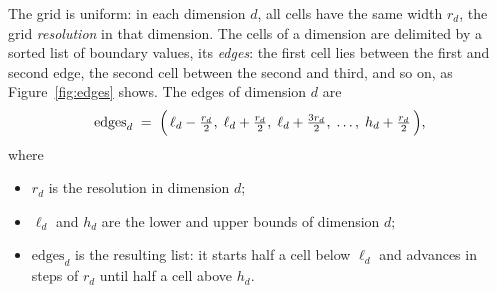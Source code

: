 \documentclass[11pt,a4paper]{article}
\theoremstyle{plain}
\theoremstyle{remark}
\begin{document}
	The grid is uniform: in each dimension $d$, all cells have the same
	width $r_d$, the grid \emph{resolution} in that dimension. The cells
	of a dimension are delimited by a sorted list of boundary values, its
	\emph{edges}: the first cell lies between the first and second edge,
	the second cell between the second and third, and so on, as
	Figure~\ref{fig:edges} shows. The edges of dimension $d$ are
	\begin{equation}
		\text{edges}_d \;=\; \Bigl(\, \ell_d - \tfrac{r_d}{2},\;
		\ell_d + \tfrac{r_d}{2},\; \ell_d + \tfrac{3 r_d}{2},\; \dots,\;
		h_d + \tfrac{r_d}{2} \,\Bigr),
		\label{eq:bins}
	\end{equation}
	where
	\begin{itemize}
		\item $r_d$ is the resolution in dimension $d$;
		\item $\ell_d$ and $h_d$ are the lower and upper bounds of dimension
		$d$;
		\item $\text{edges}_d$ is the resulting list: it starts half a cell
		below $\ell_d$ and advances in steps of $r_d$ until half a cell above
		$h_d$.
	\end{itemize}
	
\end{document}
